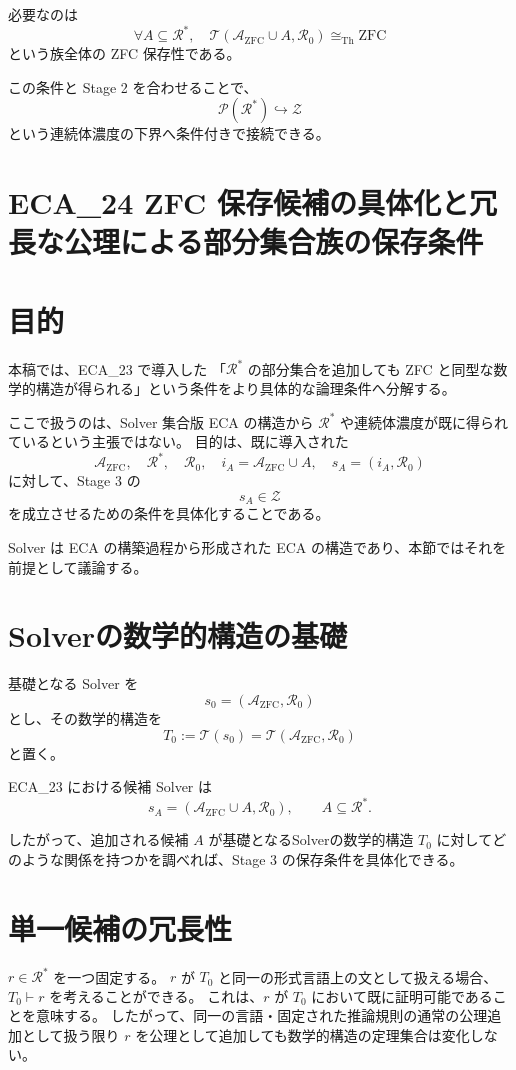 \documentclass[a4paper,11pt]{article}
\begin{document}
必要なのは
\[
\boxed{
\forall A\subseteq\mathcal{R}^*,
\quad
\mathcal{T}(\mathcal{A}_{\mathrm{ZFC}}\cup A,\mathcal{R}_0)
\cong_{\mathrm{Th}}\mathrm{ZFC}
}
\]
という族全体の ZFC 保存性である。

この条件と Stage 2 を合わせることで、
\[
\mathcal{P}(\mathcal{R}^*)\hookrightarrow\mathcal{Z}
\]
という連続体濃度の下界へ条件付きで接続できる。




\section{ECA_24 ZFC 保存候補の具体化と冗長な公理による部分集合族の保存条件}

\section{目的}

本稿では、ECA_23 で導入した
「$\mathcal{R}^*$ の部分集合を追加しても ZFC と同型な数学的構造が得られる」という条件をより具体的な論理条件へ分解する。

ここで扱うのは、Solver 集合版 ECA の構造から $\mathcal{R}^*$ や連続体濃度が既に得られているという主張ではない。
目的は、既に導入された
\[
\mathcal{A}_{\mathrm{ZFC}},\quad
\mathcal{R}^*,\quad
\mathcal{R}_0,\quad
i_A=\mathcal{A}_{\mathrm{ZFC}}\cup A,\quad
s_A=(i_A,\mathcal{R}_0)
\]
に対して、Stage 3 の
\[
s_A\in\mathcal{Z}
\]
を成立させるための条件を具体化することである。

Solver は ECA の構築過程から形成された ECA の構造であり、本節ではそれを前提として議論する。

\section{Solverの数学的構造の基礎}

基礎となる Solver を
\[
s_0=(\mathcal{A}_{\mathrm{ZFC}},\mathcal{R}_0)
\]
とし、その数学的構造を
\[
T_0:=\mathcal{T}(s_0)
=\mathcal{T}(\mathcal{A}_{\mathrm{ZFC}},\mathcal{R}_0)
\]
と置く。

ECA_23 における候補 Solver は
\[
s_A=(\mathcal{A}_{\mathrm{ZFC}}\cup A,\mathcal{R}_0),
\qquad
A\subseteq\mathcal{R}^*.
\]

したがって、追加される候補 $A$ が基礎となるSolverの数学的構造 $T_0$ に対してどのような関係を持つかを調べれば、Stage 3 の保存条件を具体化できる。

\section{単一候補の冗長性}
$r\in\mathcal{R}^*$ を一つ固定する。
$r$ が $T_0$ と同一の形式言語上の文として扱える場合、$T_0\vdash r$ を考えることができる。
これは、$r$ が $T_0$ において既に証明可能であることを意味する。
したがって、同一の言語・固定された推論規則の通常の公理追加として扱う限り $r$ を公理として追加しても数学的構造の定理集合は変化しない。
\end{document}
